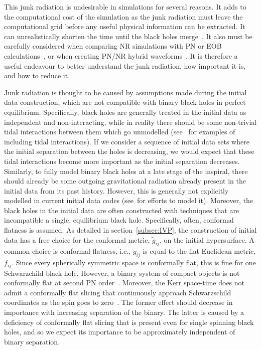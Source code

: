 This junk radiation is undesirable in simulations for several
reasons. It adds to the computational cost of the simulation as the
junk radiation must leave the computational grid before any useful
physical information can be extracted. It can unrealistically shorten
the time until the black holes
merge~\citep{BodeEtAl:2008}. It also must be carefully considered when
comparing NR simulations with PN or EOB
calculations~\citep{Damour:2011fu}, or when creating PN/NR hybrid waveforms~\citep{MacDonald:2011ne}. It is therefore a useful endeavour to better
understand the junk radiation, how important it is, and how to reduce
it.

Junk radiation is thought to be caused by assumptions made during the
initial data construction, which are not compatible with binary black holes in perfect equilibrium. Specifically,
 black holes are generally treated in the
initial data as independent and non-interacting, while in reality
there should be some non-trivial tidal interactions between them which go unmodelled
(see~\cite{Chu:2014,JohnsonMcDaniel:2009dq} for examples of including tidal interactions). If
we consider a sequence of initial data sets where the initial
separation between the holes is decreasing, we would expect that these tidal interactions become more important as the initial separation
decreases. Similarly, to fully model binary black holes at a late stage of the inspiral,
there should already be some outgoing gravitational radiation already present in the initial data from its past history.
However, this is generally not explicitly modelled in current initial data codes (see~ for efforts to model it).
Moreover, the black holes in the initial data are often constructed
with techniques that are incompatible a single, equilibrium black  hole.  Specifically, often, conformal flatness is assumed. As detailed in section~\ref{subsec:IVP}, the construction of initial data has a
free choice for the conformal metric, $\tilde{g}_{ij}$, on the initial
hypersurface. A common choice is conformal flatness, i.e.,
$\tilde{g}_{ij}$ is equal to the flat Euclidean metric, $f_{ij}$. Since every
spherically symmetric space is conformally flat, this is fine
for one Schwarzchild black hole. However,  a
binary system of compact objects is not conformally flat at second PN
order~\citep{Rieth:1997}. Moreover, the Kerr space-time does not admit a
conformally flat slicing that continuously approach Schwarzschild
coordinates as the spin goes to zero~\citep{GaratPrice:2000}. 
The former effect should decrease in importance with increasing separation of the binary.  The latter is caused by a deficiency of conformally flat slicing that is present even for single spinning black holes, and so we expect its importance
to be approximately independent of binary separation.

